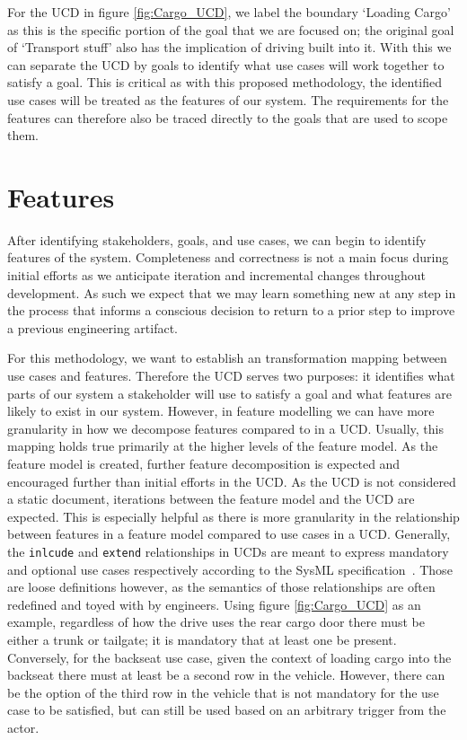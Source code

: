 For the \ac{UCD} in figure \ref{fig:Cargo_UCD}, we label the boundary `Loading Cargo' as this is the specific portion of the goal that we are focused on; the original goal of `Transport stuff' also has the implication of driving built into it. With this we can separate the \ac{UCD} by goals to identify what use cases will work together to satisfy a goal. This is critical as with this proposed methodology, the identified use cases will be treated as the features of our system. The requirements for the features can therefore also be traced directly to the goals that are used to scope them. 

\section{Features}
\label{sec:features}

After identifying stakeholders, goals, and use cases, we can begin to identify features of the system. Completeness and correctness is not a main focus during initial efforts as we anticipate iteration and incremental changes throughout development. As such we expect that we may learn something new at any step in the process that informs a conscious decision to return to a prior step to improve a previous engineering artifact. 

For this methodology, we want to establish an transformation mapping between use cases and features. Therefore the \ac{UCD} serves two purposes: it identifies what parts of our system a stakeholder will use to satisfy a goal and what features are likely to exist in our system. However, in feature modelling we can have more granularity in how we decompose features compared to in a \ac{UCD}. Usually, this mapping holds true primarily at the higher levels of the feature model. As the feature model is created, further feature decomposition is expected and encouraged further than initial efforts in the \ac{UCD}. As the \ac{UCD} is not considered a static document, iterations between the feature model and the \ac{UCD} are expected. This is especially helpful as there is more granularity in the relationship between features in a feature model compared to use cases in a \ac{UCD}. Generally, the \texttt{inlcude} and \texttt{extend} relationships in \ac{UCD}s are meant to express mandatory and optional use cases respectively according to the SysML specification~\cite{sysml2019omg}. Those are loose definitions however, as the semantics of those relationships are often redefined and toyed with by engineers. Using figure \ref{fig:Cargo_UCD} as an example, regardless of how the drive uses the rear cargo door there must be either a trunk or tailgate; it is mandatory that at least one be present. Conversely, for the backseat use case, given the context of loading cargo into the backseat there must at least be a second row in the vehicle. However, there can be the option of the third row in the vehicle that is not mandatory for the use case to be satisfied, but can still be used based on an arbitrary trigger from the actor.

